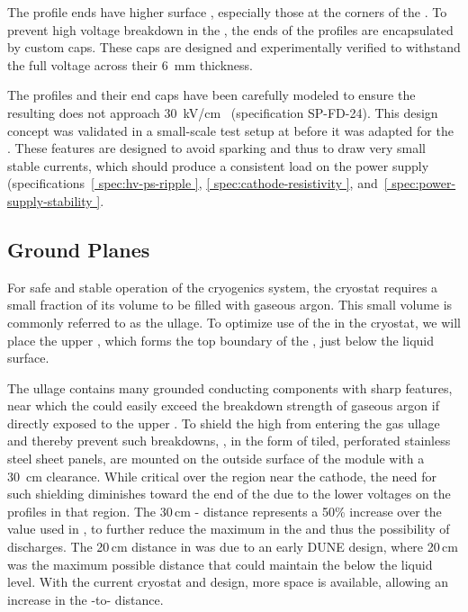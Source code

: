 The profile ends have higher surface \efield{}, especially those at the corners of the . To prevent high voltage breakdown in the , the ends of the profiles are encapsulated by custom  caps.  These caps are designed and experimentally verified to withstand the full voltage across their \SI{6}{\milli\m} thickness. 

The profiles and their end caps have been carefully modeled to ensure the resulting \efield{}
 does not approach \SI{30}{\kV}/{cm}~\cite{Blatter:2014wua} (specification SP-FD-24). This design concept was validated in a small-scale test setup at  before it was adapted for the .  
These features are designed to avoid sparking and thus to draw very small stable currents, 
which should produce a consistent load on the power supply 
(specifications~\ref{ spec:hv-ps-ripple }, \ref{ spec:cathode-resistivity }, 
and~\ref{ spec:power-supply-stability }. %


\subsection{Ground Planes}
\label{sec:fdsp-hv-des-fc-gp}

For safe and stable operation of the  cryogenics system, the cryostat requires a small fraction of its volume to be filled with gaseous argon. This small volume is commonly referred to as the ullage. To optimize use of the  in the cryostat, we will place the upper , which forms the top boundary of the , just below the liquid surface.

The ullage contains many grounded %
conducting components with sharp features, near which the \efield could easily exceed the breakdown strength of gaseous argon if directly exposed to the upper . %
To shield the high \efield from entering the gas ullage and thereby prevent such breakdowns, %
, %
in the form of tiled, perforated stainless steel sheet panels, are mounted on the outside surface of the 
 module with a \SI{30}{cm} clearance. While critical over the region near the cathode, the need for such shielding diminishes toward the  end of the  due to the lower voltages on the  profiles in that region. 
The 30\,cm - distance represents a 50\% increase over the value used in , to further reduce the maximum \efield in the  and thus the possibility of discharges. The 20\,cm distance in  was due to an early DUNE design, where 20\,cm was the maximum possible distance that could maintain the  below the liquid level. With the current cryostat and  design, more space is available, allowing an increase in the -to- distance. 
 
